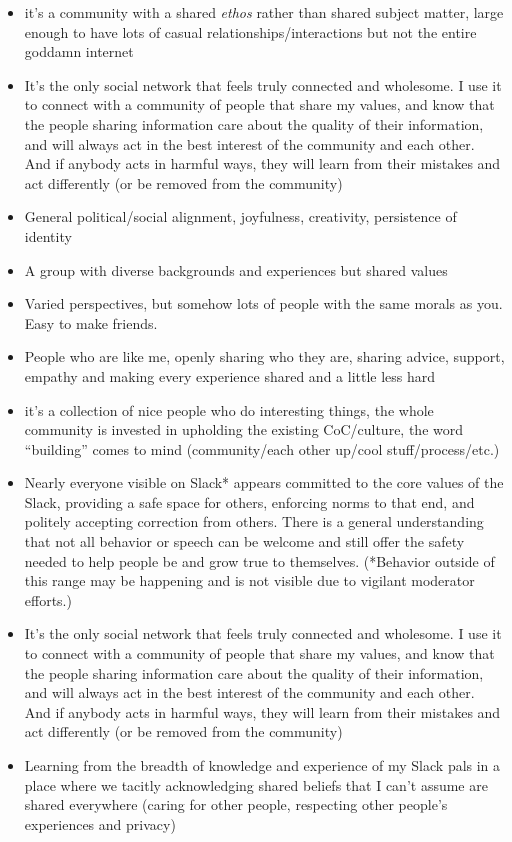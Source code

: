 \documentclass[
]{book}
\providecommand{\tightlist}{%
  \setlength{\itemsep}{0pt}\setlength{\parskip}{0pt}}
\begin{document}
\begin{itemize}
\tightlist
\item
  it's a community with a shared \emph{ethos} rather than shared subject matter, large enough to have lots of casual relationships/interactions but not the entire goddamn internet
\item
  It's the only social network that feels truly connected and wholesome. I use it to connect with a community of people that share my values, and know that the people sharing information care about the quality of their information, and will always act in the best interest of the community and each other. And if anybody acts in harmful ways, they will learn from their mistakes and act differently (or be removed from the community)
\item
  General political/social alignment, joyfulness, creativity, persistence of identity
\item
  A group with diverse backgrounds and experiences but shared values
\item
  Varied perspectives, but somehow lots of people with the same morals as you. Easy to make friends.
\item
  People who are like me, openly sharing who they are, sharing advice, support, empathy and making every experience shared and a little less hard
\item
  it's a collection of nice people who do interesting things, the whole community is invested in upholding the existing CoC/culture, the word ``building'' comes to mind (community/each other up/cool stuff/process/etc.)
\item
  Nearly everyone visible on Slack* appears committed to the core values of the Slack, providing a safe space for others, enforcing norms to that end, and politely accepting correction from others. There is a general understanding that not all behavior or speech can be welcome and still offer the safety needed to help people be and grow true to themselves. (*Behavior outside of this range may be happening and is not visible due to vigilant moderator efforts.)
\item
  It's the only social network that feels truly connected and wholesome. I use it to connect with a community of people that share my values, and know that the people sharing information care about the quality of their information, and will always act in the best interest of the community and each other. And if anybody acts in harmful ways, they will learn from their mistakes and act differently (or be removed from the community)
\item
  Learning from the breadth of knowledge and experience of my Slack pals in a place where we tacitly acknowledging shared beliefs that I can't assume are shared everywhere (caring for other people, respecting other people's experiences and privacy)
\end{itemize}
\end{document}
